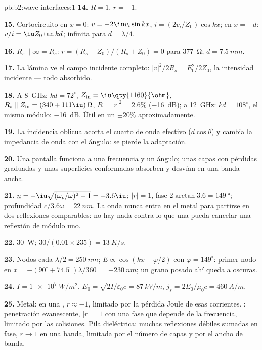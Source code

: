 \begin{solution}{pb:b2:wave-interfaces:1}
\textbf{14.} $R = 1$, $r = -1$.

\textbf{15.} Cortocircuito en $x = 0$: $v = -2\iu v_i\sin kx$, $i = (2v_i/Z_0)\cos kx$;
en $x = -d$: $v/i = \iu Z_0\tan kd$; infinita para $d = \lambda/4$.

\textbf{16.} $R_s \parallel \infty = R_s$: $r = (R_s - Z_0)/(R_s + Z_0) = 0$ para
\qty{377}{\ohm}; $d = \qty{7.5}{mm}$.

\textbf{17.} La lámina ve el campo incidente completo: $|v|^2/2R_s =
E_0^2/2Z_0$, la intensidad incidente --- todo absorbido.

\textbf{18.} A \qty{8}{GHz}: $kd = 72^\circ$, $Z_{\text{in}} = \iu\qty{1160}{\ohm}$, $R_s \parallel
Z_{\text{in}} = (340 + 111\iu)\,\Omega$, $R = |r|^2 = 2.6\%$ (\qty{-16}{dB}); a \qty{12}{GHz}:
$kd = 108^\circ$, el mismo módulo: \qty{-16}{dB}. Útil en un $\pm20\%$ aproximadamente.

\textbf{19.} La incidencia oblicua acorta el cuarto de onda efectivo
($d\cos\theta$) y cambia la impedancia de onda con el ángulo: se
pierde la adaptación.

\textbf{20.} Una pantalla funciona a una frecuencia y un ángulo; unas capas
con pérdidas graduadas y unas superficies conformadas absorben y desvían en una banda ancha.

\textbf{21.} $\underline n = -\iu\sqrt{(\omega_p/\omega)^2 - 1} = -3.6\iu$; $|r| = 1$, fase
$2\arctan3.6 = \qty{149}{\degree}$; profundidad $c/3.6\omega = \qty{22}{nm}$. La onda nunca
entra en el metal para partirse en dos reflexiones comparables: no hay
nada contra lo que una  pueda cancelar una reflexión de módulo uno.

\textbf{22.} \qty{30}{W}; $30/(0.01 \times 235) = \qty{13}{K/s}$.

\textbf{23.} Nodos cada $\lambda/2 = \qty{250}{nm}$; $E \propto \cos(kx + \varphi/2)$ con $\varphi =
149^\circ$: primer nodo en $x = -(90^\circ + 74.5^\circ)\lambda/360^\circ = \qty{-230}{nm}$; un
grano posado ahí queda a oscuras.

\textbf{24.} $I = \qty{1e7}{W/m^2}$, $E_0 = \sqrt{2I/\varepsilon_0c} = \qty{87}{kV/m}$, $j_s =
2E_0/\mu_0c = \qty{460}{A/m}$.

\textbf{25.} Metal:  en una , $r \approx -1$, limitado
por la pérdida Joule de esas corrientes. : penetración evanescente,
$|r| = 1$ con una fase que depende de la frecuencia, limitado por las colisiones.
Pila dieléctrica: muchas reflexiones débiles sumadas en fase, $r \to 1$ en una
banda, limitada por el número de capas y por el ancho de banda.
\end{solution}
